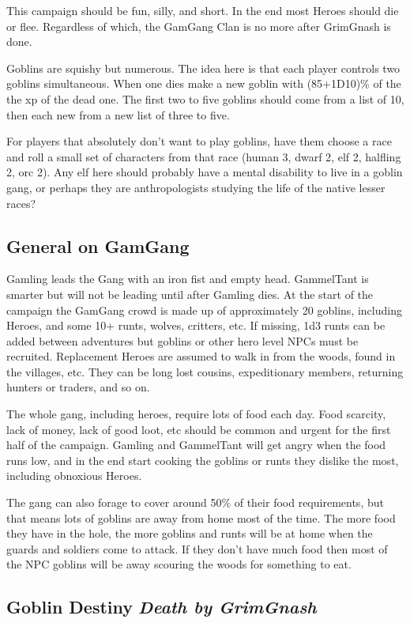 This campaign should be fun, silly, and short. In the end most Heroes should die or flee. Regardless of which, the GamGang Clan is no more after GrimGnash is done.

Goblins are squishy but numerous. The idea here is that each player controls two goblins simultaneous. When one dies make a new goblin with (85+1D10)\% of the the xp of the dead one. The first two to five goblins should come from a list of 10, then each new from a new list of three to five.

For players that absolutely don't want to play goblins, have them choose a race and roll a small set of characters from that race (human 3, dwarf 2, elf 2, halfling 2, orc 2). Any elf here should probably have a mental disability to live in a goblin gang, or perhaps they are anthropologists studying the life of the native lesser races?


\subsection*{General on GamGang}

Gamling leads the Gang with an iron fist and empty head. GammelTant is smarter but will not be leading until after Gamling dies.
At the start of the campaign the GamGang crowd is made up of approximately 20 goblins, including Heroes, and some 10+ runts, wolves, critters, etc. If missing, 1d3 runts can be added between adventures but goblins or other hero level NPCs must be recruited. Replacement Heroes are assumed to walk in from the woods, found in the villages, etc. They can be long lost cousins, expeditionary members, returning hunters or traders, and so on.

The whole gang, including heroes, require lots of food each day. Food scarcity, lack of money, lack of good loot, etc should be common and urgent for the first half of the campaign. Gamling and GammelTant will get angry when the food runs low, and in the end start cooking the goblins or runts they dislike the most, including obnoxious Heroes.

The gang can also forage to cover around 50\% of their food requirements, but that means lots of goblins are away from home most of the time. The more food they have in the hole, the more goblins and runts will be at home when the guards and soldiers come to attack. If they don't have much food then most of the NPC goblins will be away scouring the woods for something to eat.


\subsection*{Goblin Destiny\,\textendash\,\emph{Death by GrimGnash}}

